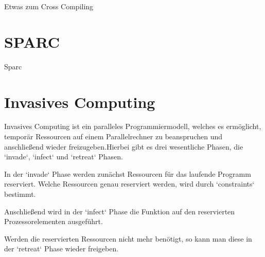 Etwas zum Cross Compiling



\section{SPARC}

Sparc

\section{Invasives Computing}

Invasives Computing ist ein paralleles Programmiermodell, welches es ermöglicht, temporär Ressourcen auf einem Parallelrechner
zu beanspruchen und anschließend wieder freizugeben.Hierbei gibt es drei wesentliche Phasen, die `invade`, `infect` und `retreat` Phasen. 

In der `invade` Phase werden zunächst Ressourcen für das laufende Programm reserviert. Welche Ressourcen genau reserviert werden,
wird durch `constraints` bestimmt.

Anschließend wird in der `infect` Phase die Funktion auf den reservierten Prozessorelementen ausgeführt.

Werden die reservierten Ressourcen nicht mehr benötigt, so kann man diese in der `retreat` Phase wieder freigeben.
